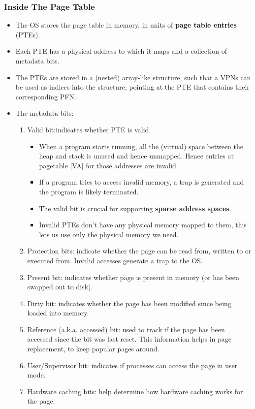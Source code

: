 \documentclass[10pt]{report}
\begin{document}
\subsubsection{Inside The Page Table}
\begin{itemize}
\item The OS stores the page table in memory, in units of
\textbf{page table entries} (PTEs).
\item Each PTE has a physical address to which it maps and a collection of metadata bits.
\item The PTEs are stored in a (nested) array-like structure, such
that a VPNs can be used as indices into the structure, pointing
at the PTE that contains their corresponding PFN.
\item The metadata bits:
\begin{enumerate}
    \item Valid bit:indicates whether PTE is valid.
    \begin{itemize}
        \item When a program starts running, all the (virtual) space 
        between the heap and stack is unused and hence unmapped. 
        Hence entries at pagetable [VA] for those addresses are 
        invalid.
        \item If a program tries to access invalid memory, a trap is
        generated and the program is likely terminated.
        \item The valid bit is crucial for supporting \textbf{sparse address spaces}.
        \item Invalid PTEs don't have any physical memory mapped to 
        them, this lets us use only the physical memory we need.
    \end{itemize}
     \item Protection bits: indicate whether the page can be
     read from, written to or executed from. Invalid accesses
     generate a trap to the OS.
     \item Present bit: indicates whether page is present in memory
     (or has been swapped out to disk).
     \item Dirty bit: indicates whether the page has been modified 
     since being loaded into memory.
     \item Reference (a.k.a. accessed) bit: used to track if the
     page has been accessed since the bit was last reset. This 
     information helps in page replacement, to keep popular pages
     around.
     \item User/Supervisor bit: indicates if processes can access
     the page in user mode.
     \item Hardware caching bits: help determine how hardware caching works for the page. 
\end{enumerate}
\end{itemize}
\end{document}
